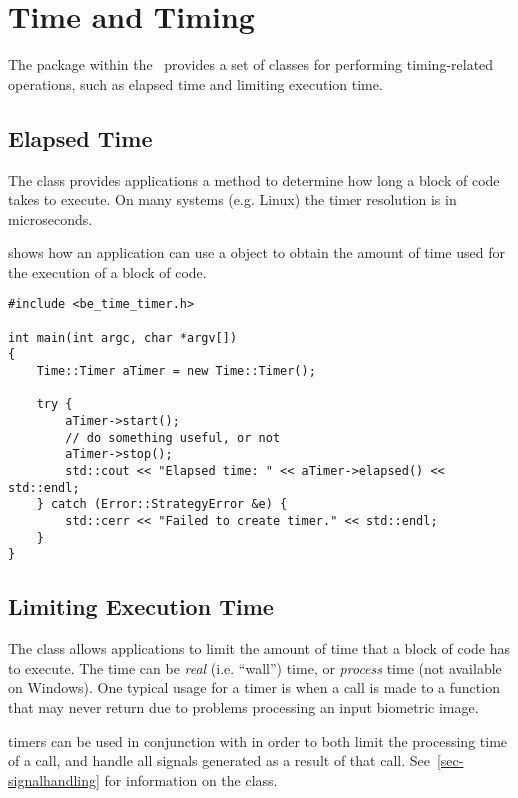 %
%
\chapter{Time and Timing}
\label{chp-time}

The  package within the \lname\ provides a set of classes for performing
timing-related operations, such as elapsed time and limiting execution time.

\section{Elapsed Time}

The  class provides applications a method to determine how long
a block of code takes to execute. On many systems (e.g. Linux) the timer
resolution is in microseconds.

 shows how an application can use a 
object to obtain the amount of time used for the execution of a block
of code.

\begin{lstlisting}[caption={Using the \class{Timer}}, label=lst:timeruse]
#include <be_time_timer.h>

int main(int argc, char *argv[])
{
	Time::Timer aTimer = new Time::Timer();

	try {
		aTimer->start();
		// do something useful, or not
		aTimer->stop();
		std::cout << "Elapsed time: " << aTimer->elapsed() << std::endl;
	} catch (Error::StrategyError &e) {
		std::cerr << "Failed to create timer." << std::endl;
	}
}
\end{lstlisting}

\section{Limiting Execution Time}

The  class allows applications to limit the amount of time
that a block of code has to execute. The time can be {\em real} (i.e. ``wall'')
time, or {\em process} time (not available on Windows). One typical usage for
a  timer is when a call is made to a function that may never return due to problems processing an input biometric image.

 timers can be used in conjunction with  in
order to both limit the processing time of a call, and handle all signals
generated as a result of that call. See~\ref{sec-signalhandling} for
information on the  class.

